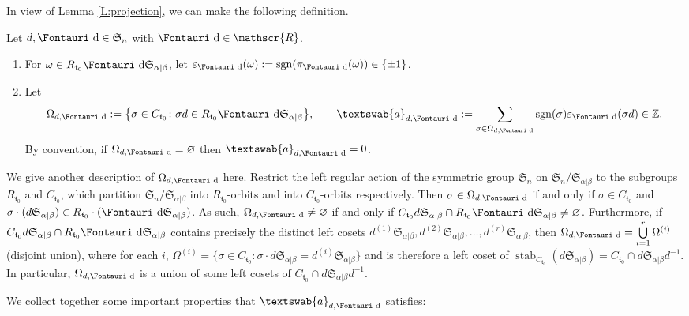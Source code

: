 \documentclass[pdftex]{sigma}
\renewcommand{\t}{\mathfrak{t}}
\renewcommand{\a}{\textswab{a}}
\newcommand{\sgn}{\mathrm{sgn}}
\newcommand{\stab}{\operatorname{stab}}
\newcommand{\sym}[1]{\mathfrak{S}_{#1}}
\newcommand{\R}{\mathscr{R}}
\newcommand{\dR}{\text{\Fontauri d}}
\newcommand{\e}{\varepsilon}
\newcommand{\Z}{\mathbb{Z}}
\begin{document}
In view of Lemma \ref{L:projection}, we can make the following definition.

\begin{Definition}\label{D:Omega&a}
Let $d, \dR \in \sym{n}$ with $\dR \in \R$.
\begin{enumerate}\itemsep=0pt
\item [(i)] For $\omega \in R_{\t_0} \dR \sym{\alpha|\beta}$, let $\e_{\dR}(\omega) :=\sgn(\pi_{\dR}(\omega))\in \{\pm1\}$.
\item [(ii)] Let
\begin{gather*}
\Omega_{d,\dR} := \big\{ \sigma \in C_{\t_0}\colon \sigma d \in R_{\t_0} \dR \sym{\alpha|\beta} \big\}, \qquad
\a_{d,\dR} := \sum_{\sigma \in \Omega_{d,\dR} } \sgn(\sigma) \e_{\dR}(\sigma d) \in \Z.
\end{gather*} By convention, if $\Omega_{d,\dR}=\varnothing$ then $\a_{d,\dR}=0$.
\end{enumerate}
\end{Definition}

\begin{Remark} \label{Omega}
We give another description of $\Omega_{d,\dR}$ here. Restrict the left regular action of the symmetric group $\sym{n}$ on $\sym{n}/\sym{\alpha|\beta}$ to the subgroups $R_{\t_0}$ and $C_{\t_0}$, which partition $\sym{n}/\sym{\alpha|\beta}$ into $R_{\t_0}$-orbits and into $C_{\t_0}$-orbits respectively. Then $\sigma \in \Omega_{d,\dR}$ if and only if $\sigma \in C_{\t_0}$ and $\sigma \cdot (d\sym{\alpha|\beta}) \in R_{\t_0} \cdot (\dR\sym{\alpha|\beta})$. As such, $\Omega_{d,\dR} \ne \varnothing$ if and only if $C_{\t_0}d\sym{\alpha|\beta} \cap R_{\t_0} \dR\sym{\alpha|\beta} \ne \varnothing$. Furthermore, if $C_{\t_0}d\sym{\alpha|\beta} \cap R_{\t_0} \dR\sym{\alpha|\beta}$ contains precisely the distinct left cosets $d^{(1)}\sym{\alpha|\beta}, d^{(2)}\sym{\alpha|\beta}, \dotsc, d^{(r)}\sym{\alpha|\beta}$, then $\Omega_{d,\dR} = \bigcup\limits_{i=1}^r \Omega^{(i)}$ (disjoint union), where for each $i$, $\Omega^{(i)} = \{ \sigma \in C_{\t_0}\colon \sigma \cdot d\sym{\alpha|\beta} = d^{(i)}\sym{\alpha|\beta} \}$ and is therefore a left coset of $\stab_{C_{\t_0}} (d\sym{\alpha|\beta}) = C_{\t_0} \cap d\sym{\alpha|\beta} d^{-1}$. In particular, $\Omega_{d,\dR}$ is a union of some left cosets of $C_{\t_0} \cap d\sym{\alpha|\beta} d^{-1}$.
\end{Remark}

We collect together some important properties that $\a_{d,\dR}$ satisfies:
\end{document}

